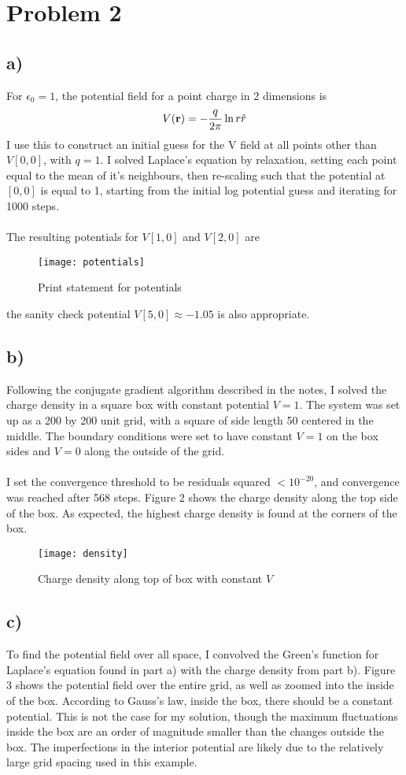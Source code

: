 \documentclass{article}
\newcommand{\<}[1]{\left\langle #1 \right\rangle }
\begin{document}
\section{Problem 2}
\subsection{a)}
For $\epsilon_0 = 1$, the potential field for a point charge in 2 dimensions is
\[V(\vb{r}) = -\frac{q}{2\pi}\ln{r}\hat{r}\]
I use this to construct an initial guess for the V field at all points other than $V[0,0]$, with $q=1$.
I solved Laplace's equation by relaxation, setting each point equal to the mean of it's neighbours, then re-scaling such that the potential at $[0,0]$ is equal to 1, starting from the initial log potential guess and iterating for 1000 steps.\\
\\
The resulting potentials for $V[1,0]$ and $V[2,0]$ are
\begin{figure}[h]
	\caption{Print statement for potentials}
	\centering
	\texttt{[image: potentials]}
\end{figure}
the sanity check potential $V[5,0]\approx -1.05$ is also appropriate.

\subsection{b)}
Following the conjugate gradient algorithm described in the notes, I solved the charge density in a square box with constant potential $V=1$. The system was set up as a 200 by 200 unit grid, with a square of side length 50 centered in the middle. The boundary conditions were set to have constant $V=1$ on the box sides and $V=0$ along the outside of the grid. \\
\\
I set the convergence threshold to be residuals squared $<10^{-20}$, and convergence was reached after 568 steps. Figure 2 shows the charge density along the top side of the box. As expected, the highest charge density is found at the corners of the box.
\begin{figure}[h]
	\caption{Charge density along top of box with constant $V$}
	\centering
	\texttt{[image: density]}
\end{figure}

\subsection{c)}
To find the potential field over all space, I convolved the Green's function for Laplace's equation found in part a) with the charge density from part b). Figure 3 shows the potential field over the entire grid, as well as zoomed into the inside of the box. According to Gauss's law, inside the box, there should be a constant potential. This is not the case for my solution, though the maximum fluctuations inside the box are an order of magnitude smaller than the changes outside the box. The imperfections in the interior potential are likely due to the relatively large grid spacing used in this example.\\\\
\end{document}
